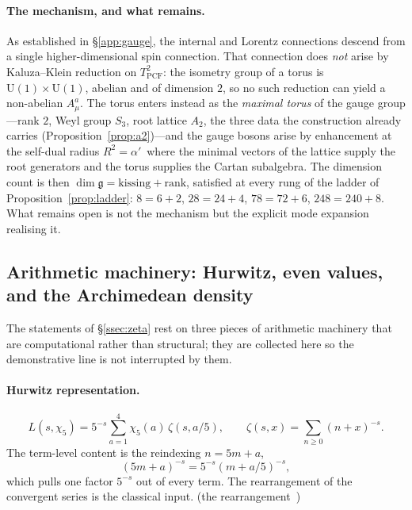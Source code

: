 \paragraph{The mechanism, and what remains.}
As established in \S\ref{app:gauge}, the internal and Lorentz connections descend from a single
higher-dimensional spin connection. That connection does
\emph{not} arise by Kaluza--Klein reduction on $T^{2}_{\mathrm{PCF}}$: the isometry group of a torus is
$\mathrm{U}(1)\times\mathrm{U}(1)$, abelian and of dimension $2$, so no such reduction can yield a
non-abelian $A^{a}_\mu$. The torus enters instead as the \emph{maximal torus} of the gauge group---rank
$2$, Weyl group $S_3$, root lattice $A_2$, the three data the construction already carries
(Proposition~\ref{prop:a2})---and the gauge bosons arise by enhancement at the self-dual radius
$R^{2}=\alpha'$\,
where the minimal vectors of the lattice supply the root
generators and the torus supplies the Cartan subalgebra. The dimension count is then
$\dim\mathfrak g=\text{kissing}+\text{rank}$, satisfied at every rung of the ladder of
Proposition~\ref{prop:ladder}: $8=6+2$, $28=24+4$, $78=72+6$, $248=240+8$. What remains open is not the
mechanism but the explicit mode expansion realising it.





\subsection{Arithmetic machinery: Hurwitz, even values, and the Archimedean density}\label{app:arithmetic}

The statements of \S\ref{ssec:zeta} rest on three pieces of arithmetic machinery that are
computational rather than structural; they are collected here so the demonstrative line is not
interrupted by them.

\paragraph{Hurwitz representation.}
\begin{equation}\label{eq:hurwitz}
  L(s,\chi_5)=5^{-s}\sum_{a=1}^{4}\chi_5(a)\,\zeta(s,a/5),
  \qquad \zeta(s,x)=\sum_{n\ge0}(n+x)^{-s} .
\end{equation}
The term-level content is the reindexing $n=5m+a$,
\begin{equation}\label{eq:reindex}
  (5m+a)^{-s}=5^{-s}(m+a/5)^{-s},
\end{equation}
which pulls one factor $5^{-s}$ out of every term. The rearrangement of the convergent series is
the classical input.  (the rearrangement~\cite{Hurwitz1891}) 

